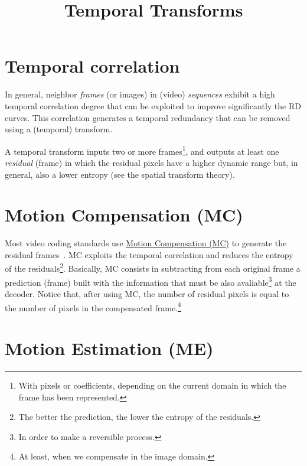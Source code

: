 


\title{Temporal Transforms}

\maketitle
\tableofcontents

\section{Temporal correlation}

In general, neighbor \emph{frames} (or images) in (video)
\emph{sequences} exhibit a high temporal correlation degree that can
be exploited to improve significantly the RD curves. This correlation
generates a temporal redundancy that can be removed using a (temporal)
transform.

A temporal transform inputs two or more frames\footnote{With pixels or
  coefficients, depending on the current domain in which the frame has
  been represented.}, and outputs at least one \emph{residual} (frame)
in which the residual pixels have a higher dynamic range but, in
general, also a lower entropy (see the spatial transform theory).


\section{Motion Compensation (MC)}

Most video coding standards use
\href{https://en.wikipedia.org/wiki/Motion_compensation}{Motion
  Compensation (MC)} to generate the residual
frames~\cite{vruiz__MC}. MC exploits the temporal correlation and
reduces the entropy of the residuals\footnote{The better the
  prediction, the lower the entropy of the residuals.}. Basically, MC
consists in subtracting from each original frame a prediction (frame)
built with the information that must be also avaliable\footnote{In
  order to make a reversible process.} at the decoder. Notice that,
after using MC, the number of residual pixels is equal to the number
of pixels in the compensated frame.\footnote{At least, when we
  compensate in the image domain.}


\section{Motion Estimation (ME)}


